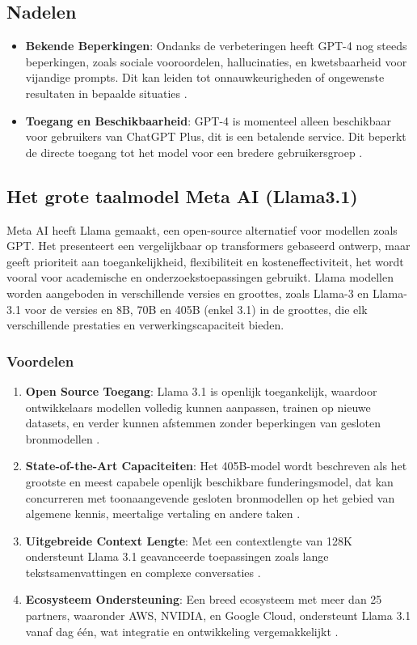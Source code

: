 \subsection*{Nadelen}
\begin{itemize}
    \item \textbf{Bekende Beperkingen}: Ondanks de verbeteringen heeft GPT-4 nog steeds beperkingen, zoals sociale vooroordelen, hallucinaties, en kwetsbaarheid voor vijandige prompts. Dit kan leiden tot onnauwkeurigheden of ongewenste resultaten in bepaalde situaties \autocite{openai_gpt4}.
    \item \textbf{Toegang en Beschikbaarheid}: GPT-4 is momenteel alleen beschikbaar voor gebruikers van ChatGPT Plus, dit is een betalende service. Dit beperkt de directe toegang tot het model voor een bredere gebruikersgroep \autocite{openai_gpt4}.
\end{itemize}





\subsection{Het grote taalmodel Meta AI (Llama3.1)}

Meta AI heeft Llama gemaakt, een open-source alternatief voor modellen zoals GPT. Het presenteert een vergelijkbaar op transformers gebaseerd ontwerp, maar geeft prioriteit aan toegankelijkheid, flexibiliteit en kosteneffectiviteit, het wordt vooral voor academische en onderzoekstoepassingen gebruikt. Llama modellen worden aangeboden in verschillende versies en groottes, zoals Llama-3 en Llama-3.1 voor de versies en 8B, 70B en 405B (enkel 3.1) in de groottes, die elk verschillende prestaties en verwerkingscapaciteit bieden.

\subsubsection{Voordelen}
\begin{enumerate}
    \item \textbf{Open Source Toegang}: Llama 3.1 is openlijk toegankelijk, waardoor ontwikkelaars modellen volledig kunnen aanpassen, trainen op nieuwe datasets, en verder kunnen afstemmen zonder beperkingen van gesloten bronmodellen \autocite{meta}.
    \item \textbf{State-of-the-Art Capaciteiten}: Het 405B-model wordt beschreven als het grootste en meest capabele openlijk beschikbare funderingsmodel, dat kan concurreren met toonaangevende gesloten bronmodellen op het gebied van algemene kennis, meertalige vertaling en andere taken \autocite{meta}.
    \item \textbf{Uitgebreide Context Lengte}: Met een contextlengte van 128K ondersteunt Llama 3.1 geavanceerde toepassingen zoals lange tekstsamenvattingen en complexe conversaties \autocite{meta}.
    \item \textbf{Ecosysteem Ondersteuning}: Een breed ecosysteem met meer dan 25 partners, waaronder AWS, NVIDIA, en Google Cloud, ondersteunt Llama 3.1 vanaf dag één, wat integratie en ontwikkeling vergemakkelijkt \autocite{meta}.
\end{enumerate}

